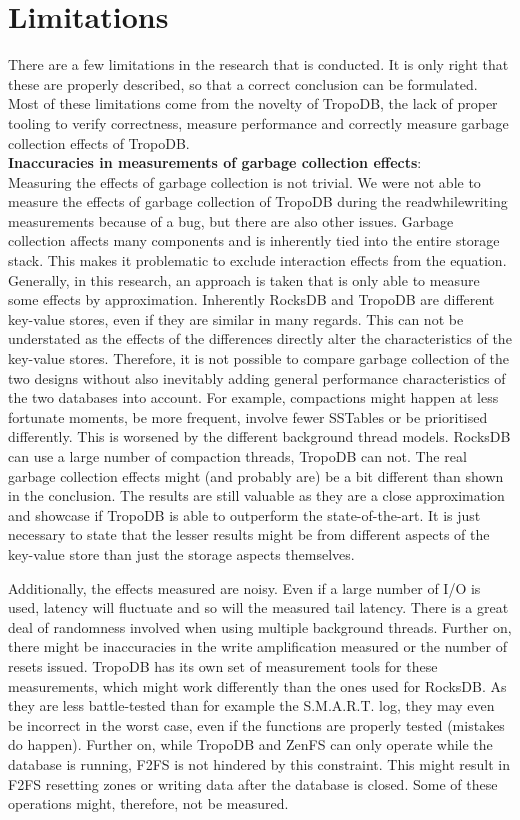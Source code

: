 \section{Limitations}
There are a few limitations in the research that is conducted. It is only right that these are properly described, so that a correct conclusion can be formulated. Most of these limitations come from the novelty of TropoDB, the lack of proper tooling to verify correctness, measure performance and correctly measure garbage collection effects of TropoDB.\\
\textbf{Inaccuracies in measurements of garbage collection effects}:\\
Measuring the effects of garbage collection is not trivial. We were not able to measure the effects of garbage collection of TropoDB during the readwhilewriting measurements because of a bug, but there are also other issues. Garbage collection affects many components and is inherently tied into the entire storage stack. This makes it problematic to exclude interaction effects from the equation. Generally, in this research, an approach is taken that is only able to measure some effects by approximation. Inherently RocksDB and TropoDB are different key-value stores, even if they are similar in many regards. This can not be understated as the effects of the differences directly alter the characteristics of the key-value stores. Therefore, it is not possible to compare garbage collection of the two designs without also inevitably adding general performance characteristics of the two databases into account. For example, compactions might happen at less fortunate moments, be more frequent, involve fewer SSTables or be prioritised differently. This is worsened by the different background thread models. RocksDB can use a large number of compaction threads, TropoDB can not. The real garbage collection effects might (and probably are) be a bit different than shown in the conclusion. The results are still valuable as they are a close approximation and showcase if TropoDB is able to outperform the state-of-the-art. It is just necessary to state that the lesser results might be from different aspects of the key-value store than just the storage aspects themselves.

Additionally, the effects measured are noisy. Even if a large number of I/O is used, latency will fluctuate and so will the measured tail latency. There is a great deal of randomness involved when using multiple background threads. Further on, there might be inaccuracies in the write amplification measured or the number of resets issued. TropoDB has its own set of measurement tools for these measurements, which might work differently than the ones used for RocksDB. As they are less battle-tested than for example the S.M.A.R.T. log, they may even be incorrect in the worst case, even if the functions are properly tested (mistakes do happen). Further on, while TropoDB and ZenFS can only operate while the database is running, F2FS is not hindered by this constraint. This might result in F2FS resetting zones or writing data after the database is closed. Some of these operations might, therefore, not be measured.

